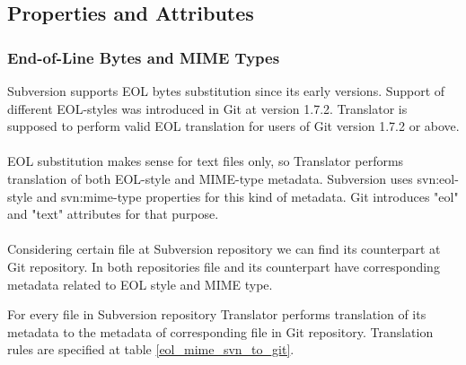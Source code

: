 \subsection{Properties and Attributes}
\subsubsection{End-of-Line Bytes and MIME Types}
Subversion supports EOL bytes substitution since its early versions. Support of different EOL-styles was introduced in Git at version 1.7.2. Translator is supposed to perform valid EOL translation for users of Git version 1.7.2 or above.
\\\\
EOL substitution makes sense for text files only, so Translator performs translation of both EOL-style and MIME-type metadata. Subversion uses svn:eol-style and svn:mime-type properties for this kind of metadata. Git introduces "eol" and "text" attributes for that purpose.
\\\\
Considering certain file at Subversion repository we can find its counterpart at Git repository. In both repositories file and its counterpart have corresponding metadata related to EOL style and MIME type.

\clearpage

For every file in Subversion repository Translator performs translation of its metadata to the metadata of corresponding file in Git repository. Translation rules are specified at table \ref{eol_mime_svn_to_git}.
\\\\\\\\\\\\

